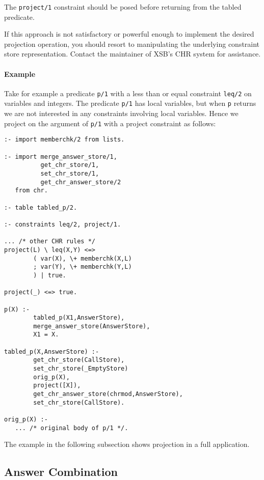 The \texttt{project/1} constraint should be posed before returning from the tabled
predicate.

If this approach is not satisfactory or powerful enough to implement the
desired projection operation, you should resort to manipulating the underlying
constraint store representation. Contact the maintainer of XSB's CHR system
for assistance.

\paragraph{Example}
Take for example a predicate \texttt{p/1} with a less than or equal constraint
\texttt{leq/2} on variables and integers. The predicate \texttt{p/1} has local
variables, but when \texttt{p} returns we are not interested in any constraints
involving local variables. Hence we project on the argument of \texttt{p/1}
with a project constraint as follows:

\begin{small}
\begin{verbatim}
:- import memberchk/2 from lists.

:- import merge_answer_store/1, 
          get_chr_store/1,
          set_chr_store/1,
          get_chr_answer_store/2
   from chr.

:- table tabled_p/2.

:- constraints leq/2, project/1.

... /* other CHR rules */
project(L) \ leq(X,Y) <=>
        ( var(X), \+ memberchk(X,L) 
        ; var(Y), \+ memberchk(Y,L)
        ) | true.
       
project(_) <=> true. 
        
p(X) :-
        tabled_p(X1,AnswerStore),
        merge_answer_store(AnswerStore),
        X1 = X.

tabled_p(X,AnswerStore) :-
        get_chr_store(CallStore),
        set_chr_store(_EmptyStore)
        orig_p(X),
        project([X]),
        get_chr_answer_store(chrmod,AnswerStore),
        set_chr_store(CallStore).
        
orig_p(X) :-
   ... /* original body of p/1 */.
\end{verbatim}
\end{small}

The example in the following subsection shows projection in a full application.

\subsection{Answer Combination}

